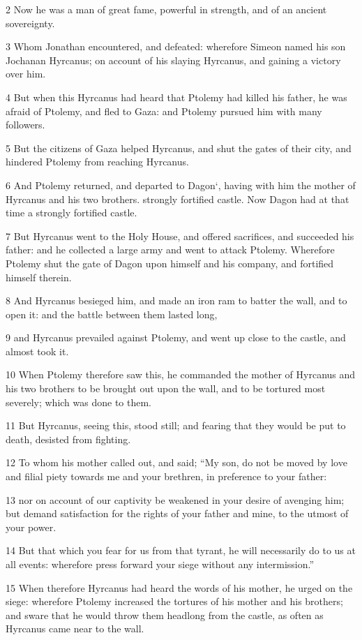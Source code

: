 2 Now he was a man of great fame, powerful in strength, and of an ancient sovereignty. 

3 Whom Jonathan encountered, and defeated: wherefore Simeon named his son Jochanan Hyrcanus; on account of his slaying Hyrcanus, and gaining a victory over him. 

4 But when this Hyrcanus had heard that Ptolemy had killed his father, he was afraid of Ptolemy, and fled to Gaza: and Ptolemy pursued him with many followers. 

5 But the citizens of Gaza helped Hyrcanus, and shut the gates of their city, and hindered Ptolemy from reaching Hyrcanus. 

6 And Ptolemy returned, and departed to Dagon‘, having with him the mother of Hyrcanus and his two brothers. strongly fortified castle. Now Dagon had at that time a strongly fortified castle.

7 But Hyrcanus went to the Holy House, and offered sacrifices, and succeeded his father: and he collected a large army and went to attack Ptolemy. Wherefore Ptolemy shut the gate of Dagon upon himself and his company, and fortified himself therein. 

8 And Hyrcanus besieged him, and made an iron ram to batter the wall, and to open it: and the battle between them lasted long, 

9 and Hyrcanus prevailed against Ptolemy, and went up close to the castle, and almost took it. 

10 When Ptolemy therefore saw this, he commanded the mother of Hyrcanus and his two brothers to be brought out upon the wall, and to be tortured most severely; which was done to them. 

11 But Hyrcanus, seeing this, stood still; and fearing that they would be put to death, desisted from fighting. 

12 To whom his mother called out, and said; “My son, do not be moved by love and filial piety towards me and your brethren, in preference to your father: 

13 nor on account of our captivity be weakened in your desire of avenging him; but demand satisfaction for the rights of your father and mine, to the utmost of your power. 

14 But that which you fear for us from that tyrant, he will necessarily do to us at all events: wherefore press forward your siege without any intermission.” 

15 When therefore Hyrcanus had heard the words of his mother, he urged on the siege: wherefore Ptolemy increased the tortures of his mother and his brothers; and sware that he would throw them headlong from the castle, as often as Hyrcanus came near to the wall. 

